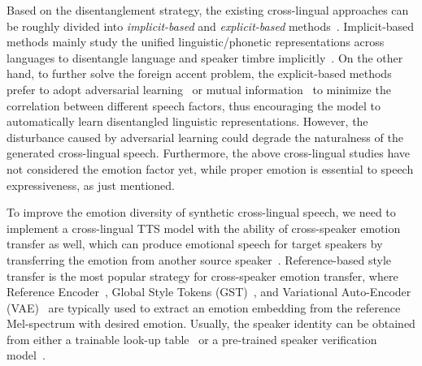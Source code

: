 \documentclass[journal,comsoc]{IEEEtran}
\begin{document}
Based on the disentanglement strategy, the existing cross-lingual approaches can be roughly divided into \textit{implicit-based} and \textit{explicit-based} methods~\cite{ye2022improving}.
Implicit-based methods mainly study the unified linguistic/phonetic representations across languages to disentangle language and speaker timbre implicitly~\cite{9053094,zhao2020towards,li2019bytes,bansal2020improving,maniati2021cross,zhan2021improve}. 
On the other hand, to further solve the foreign accent problem, the explicit-based methods prefer to adopt adversarial learning~\cite{zhang2019learning,xin2020cross,ye2022improving,nekvinda2020one} or mutual information~\cite{9414226} to minimize the correlation between different speech factors, thus encouraging the model to automatically learn disentangled linguistic representations.
However, the disturbance caused by adversarial learning could degrade the naturalness of the generated cross-lingual speech. 
Furthermore, the above cross-lingual studies have not considered the emotion factor yet, while proper emotion is essential to speech expressiveness, as just mentioned.

To improve the emotion diversity of synthetic cross-lingual speech, we need to implement a cross-lingual TTS model with the ability of cross-speaker emotion transfer as well, which can produce emotional speech for target speakers by transferring the emotion from another source speaker~\cite{Li2021ControllableCE}.
Reference-based style transfer is the most popular strategy for cross-speaker emotion transfer, where Reference Encoder~\cite{Skerry2018Towards}, Global Style Tokens (GST)~\cite{Kwon2019EmotionalSS}, and Variational Auto-Encoder (VAE)~\cite{Zhang2019LearningLR} are typically used to extract an emotion embedding from the reference Mel-spectrum with desired emotion.
Usually, the speaker identity can be obtained from either a trainable look-up table~\cite{Gibiansky2017DeepV2} or a pre-trained speaker verification model~\cite{Jia2018TransferLF}. 
\end{document}
